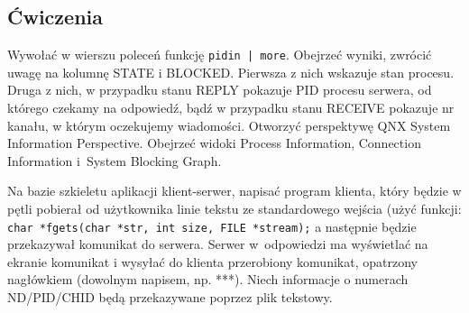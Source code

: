 \subsection{Ćwiczenia}

\begin{myenumerate}
\item Wywołać w wierszu poleceń funkcję \lstinline[style=MyCStyle]{pidin | more}. Obejrzeć wyniki, zwrócić uwagę na kolumnę STATE i BLOCKED. Pierwsza z nich wskazuje stan procesu. Druga z nich, w przypadku stanu REPLY pokazuje PID procesu serwera, od którego czekamy na odpowiedź, bądź w przypadku stanu RECEIVE pokazuje nr kanału, w którym oczekujemy wiadomości. Otworzyć perspektywę QNX System Information Perspective. Obejrzeć widoki Process Information, Connection Information i~System Blocking Graph. 
\item Na bazie szkieletu aplikacji klient-serwer, napisać program klienta, który będzie w pętli pobierał od użytkownika linie tekstu ze standardowego wejścia (użyć funkcji: \lstinline[style=MyCStyle]{char *fgets(char *str, int size, FILE *stream);} a następnie będzie przekazywał komunikat do serwera. Serwer w~odpowiedzi ma wyświetlać na ekranie komunikat i wysyłać do klienta przerobiony komunikat, opatrzony nagłówkiem (dowolnym napisem, np. ***). Niech informacje o numerach ND/PID/CHID będą przekazywane poprzez plik tekstowy. 
\end{myenumerate} 


\cleardoublepage
